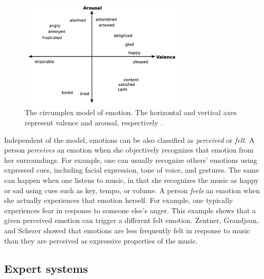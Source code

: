 \begin{figure}[!h]
\centering
\includegraphics[width=0.7\textwidth]{imgs/related_work/circumplex.png}
\caption{The circumplex model of emotion. The horizontal and vertical axes represent valence and arousal,
respectively \cite{russell1980circumplex}.}
\label{fig:circumplex}
\end{figure}

Independent of the model, emotions can be also classified as \textit{perceived} or \textit{felt}.
A person \textit{perceives} an emotion when she objectively recognizes that emotion from her surroundings. For example, one can usually recognize others' emotions using expressed cues, including facial expression, tone of voice, and gestures. The same can happen when one listens to music, in that she recognizes the music as happy or sad using cues such as key, tempo, or volume. A person \textit{feels} an emotion when she actually experiences that emotion herself. For example, one typically experiences fear in response to someone else's anger. This example shows that a given perceived emotion can trigger a different felt emotion. Zentner, Grandjean, and Scherer \cite{zentner2008emotions} showed that emotions are less frequently felt in response to music than they are perceived as expressive properties of the music.

\subsection{Expert systems}

